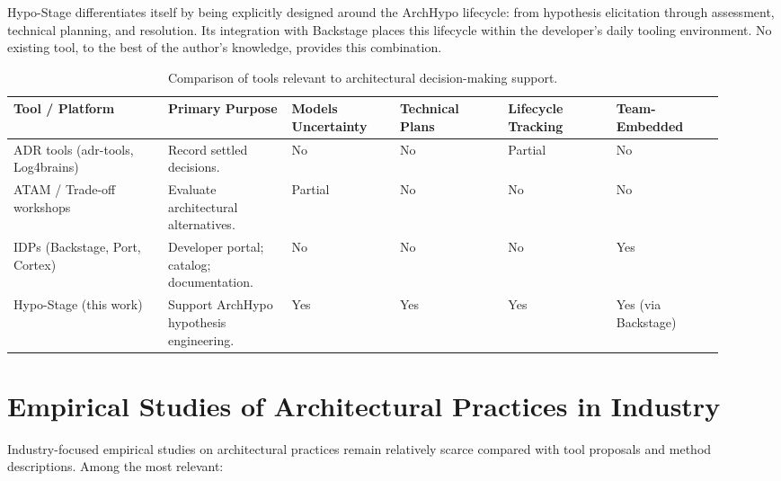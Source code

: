 Hypo-Stage differentiates itself by being explicitly designed around the ArchHypo
lifecycle: from hypothesis elicitation through assessment, technical planning, and
resolution. Its integration with Backstage places this lifecycle within the developer's
daily tooling environment. No existing tool, to the best of the author's knowledge,
provides this combination.

\begin{table}[htbp]
\centering
\caption{Comparison of tools relevant to architectural decision-making support.}
\label{tab:tools-comparison}
\begin{tabular}{p{0.20\linewidth} p{0.16\linewidth} p{0.14\linewidth} p{0.14\linewidth} p{0.14\linewidth} p{0.14\linewidth}}
\toprule
\textbf{Tool / Platform} & \textbf{Primary Purpose} & \textbf{Models Uncertainty} & \textbf{Technical Plans} & \textbf{Lifecycle Tracking} & \textbf{Team-Embedded} \\
\midrule
ADR tools (adr-tools, Log4brains) & Record settled decisions. & No & No & Partial & No \\
\midrule
ATAM / Trade-off workshops & Evaluate architectural alternatives. & Partial & No & No & No \\
\midrule
IDPs (Backstage, Port, Cortex) & Developer portal; catalog; documentation. & No & No & No & Yes \\
\midrule
Hypo-Stage (this work) & Support ArchHypo hypothesis engineering. & Yes & Yes & Yes & Yes (via Backstage) \\
\bottomrule
\end{tabular}
\end{table}

\section{Empirical Studies of Architectural Practices in Industry}
\label{sec:empirical-studies}

Industry-focused empirical studies on architectural practices remain relatively scarce
compared with tool proposals and method descriptions. Among the most relevant:

